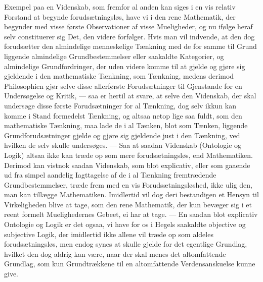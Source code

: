 \documentclass[12pt,a4paper]{book}
\begin{document}
{\small Exempel paa en Videnskab, som fremfor al anden kan siges i en vis relativ
Forstand at begynde forudsætningsløs, have vi i den rene Mathematik, der begynder med
visse første Observationer af visse Mueligheder, og nu ifølge heraf selv constituerer
sig Det, den videre forfølger. Hvis man vil indvende, at den dog forudsætter den
almindelige menneskelige Tænkning med de for samme til Grund liggende almindelige
Grundbestemmelser eller saakaldte Kategorier, og almindelige Grundfordringer, der uden
videre komme til at gjelde og gjøre sig gjeldende i den mathematiske Tænkning, som
Tænkning, medens derimod Philosophien gjør selve disse allerførste Forudsætninger til
Gjenstande for en Undersøgelse og Kritik, --- saa er hertil at svare, at selve den
Videnskab, der skal undersøge disse første Forudsætninger for al Tænkning, dog selv
ikkun kan komme i Stand formedelst Tænkning, og altsaa netop lige saa fuldt, som den
mathematiske Tænkning, maa lade de i al Tænken, blot som Tænken, liggende
Grundforudsætninger gjelde og gjøre sig gjeldende just i den Tænkning, ved hvilken de
selv skulle undersøges. --- Saa at saadan Videnskab (Ontologie og Logik) altsaa ikke
kan træde op som mere forudsætningsløs, end Mathematiken. Derimod kan vistnok saadan
Videnskab, som blot explicativ, eller som gaaende ud fra simpel aandelig Iagttagelse
af de i al Tænkning fremtrædende Grundbestemmelser, træde frem med en vis
Forudsætningsløshed, ikke ulig den, man kan tillægge Mathematiken. Imidlertid vil dog
deri bestandigen et Hensyn til Virkeligheden blive at tage, som den rene Mathematik,
der kun bevæger sig i et reent formelt Muelighedernes Gebeet, ei har at tage. --- En
saadan blot explicativ Ontologie og Logik er det ogsaa, vi have for os i Hegels
saakaldte objective og subjective Logik, der imidlertid ikke allene vil træde op som
aldeles forudsætningsløs, men endog synes at skulle gjelde for det egentlige
Grundlag, hvilket den dog aldrig kan være, naar der skal menes det altomfattende
Grundlag, som kun Grundtrækkene til en altomfattende Verdensanskuelse kunne
give.\par}
\end{document}
